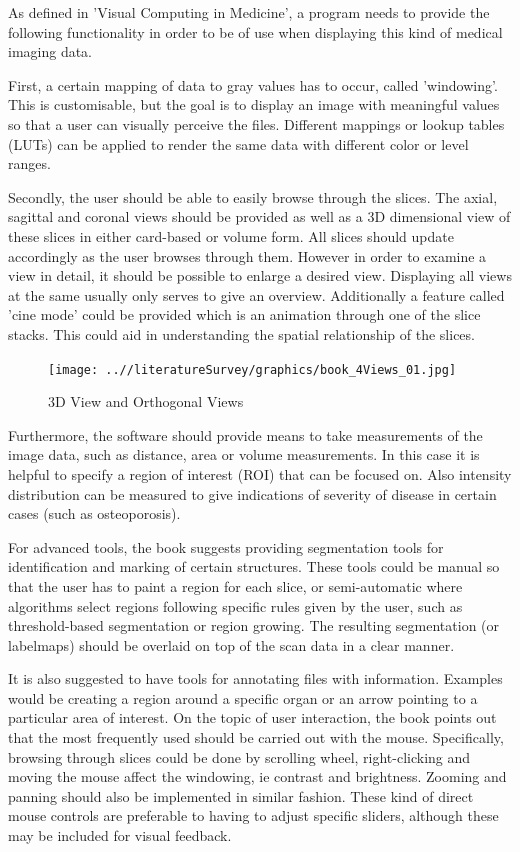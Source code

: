 \documentclass[a4paper,11pt,twoside]{article}
\begin{document}
As defined in 'Visual Computing in Medicine'\cite{book}, a program needs to provide the following functionality in order to be of use when displaying this kind of medical imaging data. 

First, a certain mapping of data to gray values has to occur, called 'windowing'. This is customisable, but the goal is to display an image with meaningful values so that a user can visually perceive the files. Different mappings or lookup tables (LUTs) can be applied to render the same data with different color or level ranges.

Secondly, the user should be able to easily browse through the slices. The axial, sagittal and coronal views should be provided as well as a 3D dimensional view of these slices in either card-based or volume form. All slices should update accordingly as the user browses through them. However in order to examine a view in detail, it should be possible to enlarge a desired view. Displaying all views at the same usually only serves to give an overview. Additionally a feature called 'cine mode' could be provided which is an animation through one of the slice stacks. This could aid in understanding the spatial relationship of the slices.



\begin{figure}[ht!]
\centering
\texttt{[image: ..//literatureSurvey/graphics/book\_4Views\_01.jpg]}
\caption{3D View and Orthogonal Views}
\label{fig:UIdesign1}
\end{figure}

Furthermore, the software should provide means to take measurements of the image data, such as distance, area or volume measurements. In this case it is helpful to specify a region of interest (ROI) that can be focused on. Also intensity distribution can be measured to give indications of severity of disease in certain cases (such as osteoporosis)\cite{book}.

For advanced tools, the book suggests providing segmentation tools for identification and marking of certain structures. These tools could be manual so that the user has to paint a region for each slice, or semi-automatic where algorithms select regions following specific rules given by the user, such as threshold-based segmentation or region growing. The resulting segmentation (or labelmaps) should be overlaid on top of the scan data in a clear manner.

It is also suggested to have tools for annotating files with information. Examples would be creating a region around a specific organ or an arrow pointing to a particular area of interest.
On the topic of user interaction, the book points out that the most frequently used should be carried out with the mouse. Specifically, browsing through slices could be done by scrolling wheel, right-clicking and moving the mouse affect the windowing, ie contrast and brightness. Zooming and panning should also be implemented in similar fashion. These kind of direct mouse controls are preferable to having to adjust specific sliders, although these may be included for visual feedback.
\end{document}
